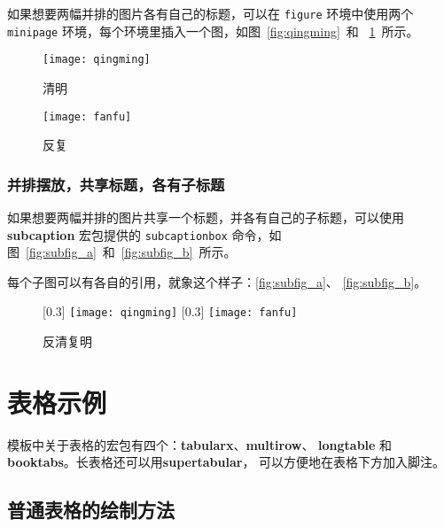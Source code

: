 如果想要两幅并排的图片各有自己的标题，可以在 \texttt{figure} 环境中使用两个
 \texttt{minipage} 环境，每个环境里插入一个图，如图~\ref{fig:qingming}~和
~\ref{fig:fanfu}~所示。

\begin{figure}[htbp]
\centering
\begin{minipage}[t]{0.3\textwidth}
    \centering
    \texttt{[image: qingming]}
    \caption{清明}
    \label{fig:qingming}
\end{minipage}
\hspace{36pt}
\begin{minipage}[t]{0.3\textwidth}
    \centering
    \texttt{[image: fanfu]}
    \caption{反复}
    \label{fig:fanfu}
\end{minipage}
\end{figure}

\subsubsection*{并排摆放，共享标题，各有子标题}

如果想要两幅并排的图片共享一个标题，并各有自己的子标题，可以使用
\textbf{subcaption} 宏包提供的 \texttt{subcaptionbox} 命令，如图~\ref{fig:subfig_a}~和~\ref{fig:subfig_b}~所示。

每个子图可以有各自的引用，就象这个样子：\ref{fig:subfig_a}、
\ref{fig:subfig_b}。

\begin{figure}[htbp]
\centering
{}[0.3\textwidth]{
    \texttt{[image: qingming]}
}
\hspace{36pt}
[0.3\textwidth]{
    \texttt{[image: fanfu]}
}
\caption{反清复明}
\end{figure}

\section{表格示例}
\label{sec:table}

模板中关于表格的宏包有四个：\textbf{tabularx}、\textbf{multirow}、
\textbf{longtable} 和\textbf{booktabs}。长表格还可以用\textbf{supertabular}，
可以方便地在表格下方加入脚注。

\subsection{普通表格的绘制方法}

